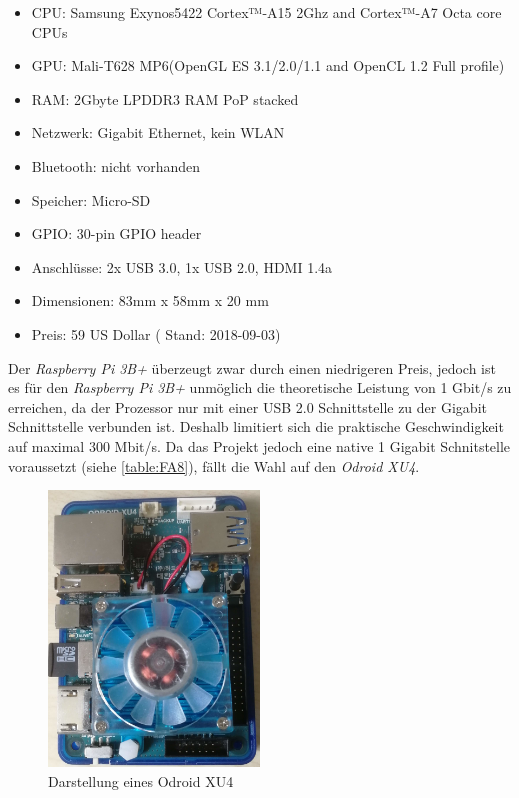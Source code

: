 \documentclass[titlepage]{report}
\begin{document}
\begin{itemize}
    \item CPU: Samsung Exynos5422 Cortex™-A15 2Ghz and Cortex™-A7 Octa core CPUs
    \item GPU: Mali-T628 MP6(OpenGL ES 3.1/2.0/1.1 and OpenCL 1.2 Full profile)
    \item RAM: 2Gbyte LPDDR3 RAM PoP stacked
    \item Netzwerk: Gigabit Ethernet, kein WLAN
    \item Bluetooth: nicht vorhanden
    \item Speicher: Micro-SD
    \item GPIO: 30-pin GPIO header\cite{ODROID_GPIO}
    \item Anschlüsse: 2x USB 3.0, 1x USB 2.0, HDMI 1.4a
    \item Dimensionen: 83mm x 58mm x 20 mm
    \item Preis: 59 US Dollar\cite{ODROID_PRICE} ( Stand: 2018-09-03)
\end{itemize}
Der \emph{Raspberry Pi 3B+} überzeugt zwar durch einen niedrigeren
Preis, jedoch ist es für den \emph{Raspberry Pi 3B+} unmöglich die
theoretische Leistung von 1 Gbit/s zu erreichen, da der Prozessor nur
mit einer USB 2.0 Schnittstelle zu der Gigabit Schnittstelle verbunden
ist. Deshalb limitiert sich die praktische Geschwindigkeit auf maximal
300 Mbit/s\cite{RASPI}. Da das Projekt jedoch eine native 1 Gigabit
Schnitstelle voraussetzt (siehe \autoref{table:FA8}), fällt die Wahl auf
den \emph{Odroid XU4}.
\begin{figure}[H]
    \centering
    \includegraphics[width=0.5\textwidth]{figures/odroid.jpg}
    \caption{Darstellung eines Odroid XU4}\label{fig:odroid}
\end{figure}
\end{document}

